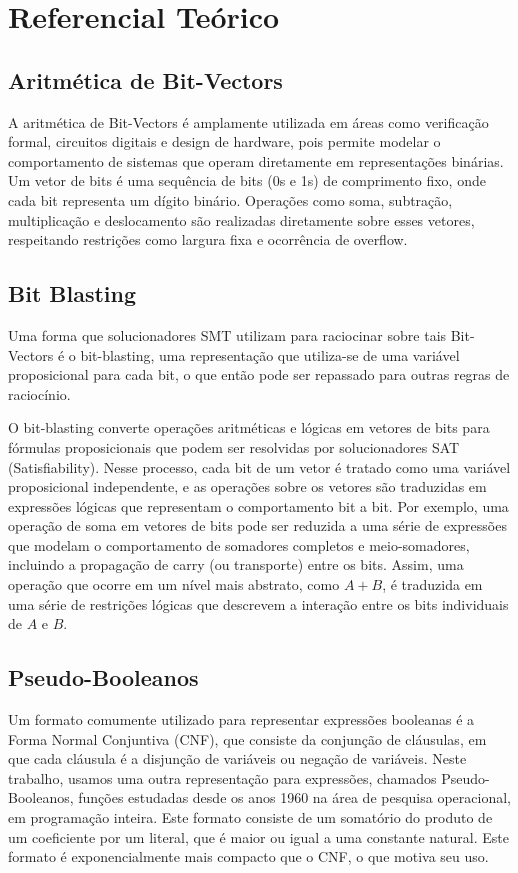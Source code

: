 \documentclass[conference]{IEEEtran}
\begin{document}
\section{Referencial Teórico}

\subsection{Aritmética de Bit-Vectors}
A aritmética de Bit-Vectors é amplamente utilizada em áreas como verificação formal,
circuitos digitais e design de hardware, pois permite modelar o comportamento de sistemas
que operam diretamente em representações binárias. Um vetor de bits é uma sequência de bits
(0s e 1s) de comprimento fixo, onde cada bit representa um dígito binário. Operações como soma,
subtração, multiplicação e deslocamento são realizadas diretamente sobre esses vetores,
respeitando restrições como largura fixa e ocorrência de overflow.


\subsection{Bit Blasting}
Uma forma que solucionadores SMT utilizam para raciocinar sobre tais Bit-Vectors é o bit-blasting,
uma representação que utiliza-se de uma variável proposicional para cada bit, o que então pode ser
repassado para outras regras de raciocínio.

O bit-blasting converte operações aritméticas e lógicas em vetores de bits para fórmulas
proposicionais que podem ser resolvidas por solucionadores SAT (Satisfiability). Nesse processo,
cada bit de um vetor é tratado como uma variável proposicional independente, e as operações sobre
os vetores são traduzidas em expressões lógicas que representam o comportamento bit a bit.
Por exemplo, uma operação de soma em vetores de bits pode ser reduzida a uma série de expressões que
modelam o comportamento de somadores completos e meio-somadores, incluindo a propagação de carry
(ou transporte) entre os bits. Assim, uma operação que ocorre em um nível mais abstrato, como
$A + B$, é traduzida em uma série de restrições lógicas que descrevem a interação entre os bits
individuais de $A$ e $B$.


\subsection{Pseudo-Booleanos}
Um formato comumente utilizado para representar expressões booleanas é a Forma Normal Conjuntiva (CNF), que
consiste da conjunção de cláusulas, em que cada cláusula é a disjunção de variáveis ou negação de variáveis\cite{CNF}.
Neste trabalho, usamos uma outra representação para expressões, chamados Pseudo-Booleanos, funções estudadas
desde os anos 1960 na área de pesquisa operacional, em programação inteira. Este formato consiste de um somatório
do produto de um coeficiente por um literal, que é maior ou igual a uma constante natural.
Este formato é exponencialmente mais compacto que o CNF, o que motiva seu uso\cite{PBSolve}.
\end{document}
